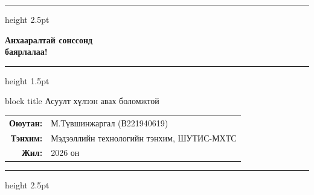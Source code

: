 \documentclass[14pt,aspectratio=169]{beamer}
\begin{document}
\begin{frame}[plain]
  \vspace{-0.3cm}
  {\color{navyblue}\hrule height 2.5pt}
  \vspace{0.5cm}
  \begin{center}
    {\Huge\bfseries\color{navyblue} Анхааралтай сонссонд}\\[6pt]
    {\Huge\bfseries\color{goldcolor} баярлалаа!}
  \end{center}
  \vspace{0.4cm}
  {\color{goldcolor}\hrule height 1.5pt}
  \vspace{0.4cm}
  \begin{center}
    \begin{beamercolorbox}[sep=0.6em,center,rounded=true]{block title}
      \large Асуулт хүлээн авах боломжтой
    \end{beamercolorbox}
  \end{center}
  \vspace{0.3cm}
  \begin{center}
    \small
    \begin{tabular}{rl}
      \textbf{Оюутан:} & М.Түвшинжаргал (В221940619) \\
      \textbf{Тэнхим:} & Мэдээллийн технологийн тэнхим, ШУТИС-МХТС \\
      \textbf{Жил:}    & 2026 он
    \end{tabular}
  \end{center}
  \vspace{0.3cm}
  {\color{navyblue}\hrule height 2.5pt}
\end{frame}
\end{document}
